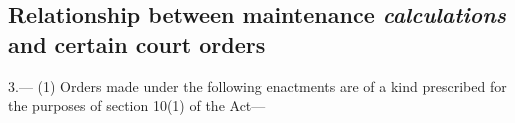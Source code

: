 \documentclass[12pt,a4paper]{article}
\begin{document}

\subsection[3. Relationship between maintenance \emph{calculations} and certain court orders]{Relationship between maintenance \emph{calculations} and certain court orders}

3.—%
%
%
%
%
%
%
(1) Orders made under the following enactments are of a kind prescribed for the purposes of section 10(1) of the Act—
\end{document}
